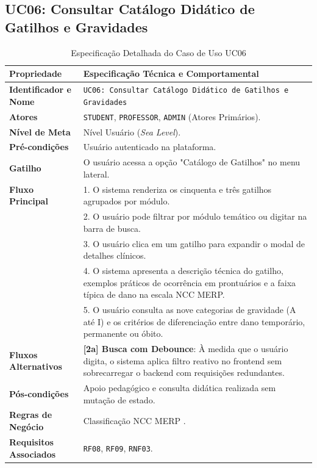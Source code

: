 \subsection{UC06: Consultar Catálogo Didático de Gatilhos e Gravidades}
\label{uc06_especificacao}

\begin{table}[!ht]
\centering
\caption{Especificação Detalhada do Caso de Uso UC06}
\label{tab_uc06}
\footnotesize
\begin{tabularx}{\textwidth}{p{3.5cm} X}
\toprule
\textbf{Propriedade} & \textbf{Especificação Técnica e Comportamental} \\
\midrule
\textbf{Identificador e Nome} & \texttt{UC06: Consultar Catálogo Didático de Gatilhos e Gravidades} \\
\textbf{Atores} & \texttt{STUDENT}, \texttt{PROFESSOR}, \texttt{ADMIN} (Atores Primários). \\
\textbf{Nível de Meta} & Nível Usuário (\textit{Sea Level}). \\
\textbf{Pré-condições} & Usuário autenticado na plataforma. \\
\textbf{Gatilho} & O usuário acessa a opção "Catálogo de Gatilhos" no menu lateral. \\
\textbf{Fluxo Principal} & 
1. O sistema renderiza os cinquenta e três gatilhos agrupados por módulo.\\
& 2. O usuário pode filtrar por módulo temático ou digitar na barra de busca.\\
& 3. O usuário clica em um gatilho para expandir o modal de detalhes clínicos.\\
& 4. O sistema apresenta a descrição técnica do gatilho, exemplos práticos de ocorrência em prontuários e a faixa típica de dano na escala NCC MERP.\\
& 5. O usuário consulta as nove categorias de gravidade (A até I) e os critérios de diferenciação entre dano temporário, permanente ou óbito. \\
\textbf{Fluxos Alternativos} & 
\textbf{[2a] Busca com Debounce}: À medida que o usuário digita, o sistema aplica filtro reativo no frontend sem sobrecarregar o backend com requisições redundantes. \\
\textbf{Pós-condições} & Apoio pedagógico e consulta didática realizada sem mutação de estado. \\
\textbf{Regras de Negócio} & Classificação NCC MERP \cite{nccmerp2001}. \\
\textbf{Requisitos Associados} & \texttt{RF08}, \texttt{RF09}, \texttt{RNF03}. \\
\bottomrule
\end{tabularx}
\end{table}
